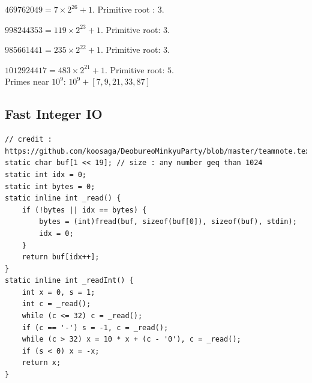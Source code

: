 \documentclass[landscape, 8pt, a4paper, oneside, twocolumn]{extarticle}
\begin{document}
$469762049 = 7 \times 2^{26} + 1$. Primitive root : $3$.

$998244353 = 119 \times 2^{23} + 1$. Primitive root: $3$.

$985661441 = 235 \times 2^{22} + 1$. Primitive root: $3$.

$1012924417 = 483 \times 2^{21} + 1$. Primitive root: $5$.
\\
Primes near $10^9$:
$10^9 + [7, 9, 21, 33, 87]$

\subsection {Fast Integer IO}
\begin{verbatim}
// credit : https://github.com/koosaga/DeobureoMinkyuParty/blob/master/teamnote.tex
static char buf[1 << 19]; // size : any number geq than 1024 
static int idx = 0;
static int bytes = 0;
static inline int _read() {
	if (!bytes || idx == bytes) {
		bytes = (int)fread(buf, sizeof(buf[0]), sizeof(buf), stdin);
		idx = 0;
	}
	return buf[idx++];
}
static inline int _readInt() {
	int x = 0, s = 1;
	int c = _read();
	while (c <= 32) c = _read();
	if (c == '-') s = -1, c = _read();
	while (c > 32) x = 10 * x + (c - '0'), c = _read();
	if (s < 0) x = -x;
	return x;
}
\end{verbatim}
\end{document}
